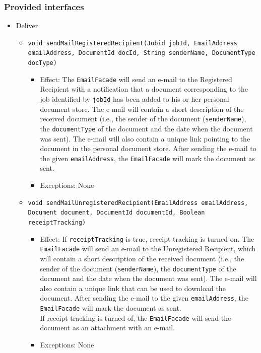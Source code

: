 \documentclass[a4paper,10pt]{article}
\begin{document}
\subsubsection*{Provided interfaces}
\begin{itemize}
    \item Deliver
    \begin{itemize}
    	\item \texttt{void sendMailRegisteredRecipient(Jobid jobId, EmailAddress emailAddress, DocumentId docId, String senderName, DocumentType docType)}    	
        \begin{itemize}
            \item Effect:  The \texttt{EmailFacade}  will send an e-mail to the Registered Recipient with a notification that a document corresponding to the job identified by \texttt{jobId} has been added to his or her personal document store. The e-mail will contain a short description of the received document (i.e., the sender of the document (\texttt{senderName}), the \texttt{documentType} of the document and the date when the document was sent). The e-mail will also contain a unique link pointing to the document in the personal document store. After sending the e-mail to the given \texttt{emailAddress}, the \texttt{EmailFacade} will mark the document as sent.
            \item Exceptions: None
		\end{itemize}
    
        \item \texttt{void sendMailUnregisteredRecipient(EmailAddress emailAddress,  Document document, DocumentId documentId, Boolean receiptTracking)}
        \begin{itemize}
            \item Effect: If \texttt{receiptTracking} is true, receipt tracking is turned on. The \texttt{EmailFacade} will send an e-mail to the Unregistered Recipient, which will contain a short description of the received document (i.e., the sender of the document (\texttt{senderName}), the \texttt{documentType} of the document and the date when the document was sent). The e-mail will also contain a unique link that can be used to download the document. After sending the e-mail to the given \texttt{emailAddress}, the \texttt{EmailFacade} will mark the document as sent.\\ If receipt tracking is turned of, the \texttt{EmailFacade} will send the document as an attachment with an e-mail.
            \item Exceptions: None
        \end{itemize}
    \end{itemize}

\end{itemize}
\end{document}
